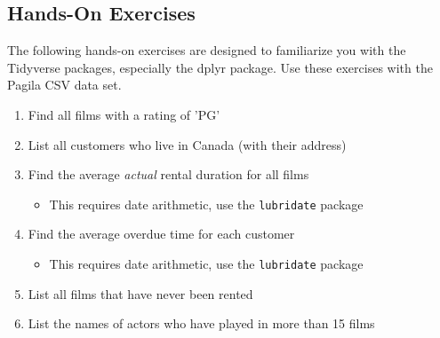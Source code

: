 \begin{tcolorbox}[colback=code]
\subsection*{Hands-On Exercises}

The following hands-on exercises are designed to familiarize you with the Tidyverse packages, especially the dplyr package. Use these exercises with the Pagila CSV data set.

\begin{enumerate}[nosep]
  \item Find all films with a rating of 'PG'
  \item List all customers who live in Canada (with their address)
  \item Find the average \emph{actual} rental duration for all films
  \begin{itemize}
     \item This requires date arithmetic, use the \texttt{lubridate} package
  \end{itemize}
  \item Find the average overdue time for each customer
  \begin{itemize}
     \item This requires date arithmetic, use the \texttt{lubridate} package
  \end{itemize}
  \item List all films that have never been rented
  \item List the names of actors who have played in more than 15 films
\end{enumerate}
\end{tcolorbox}
